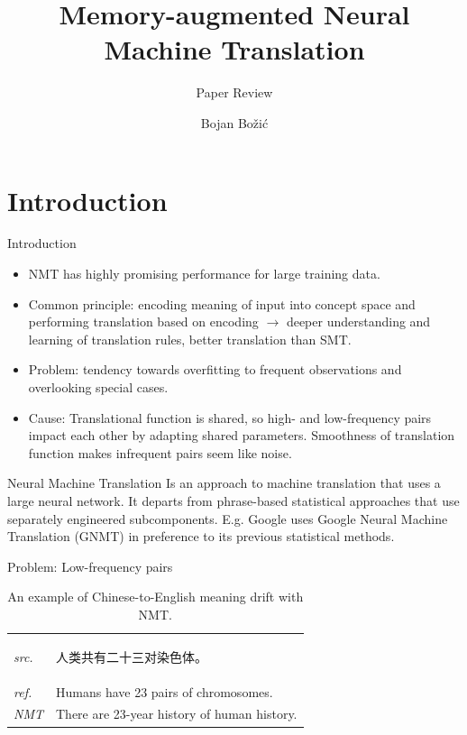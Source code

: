 \documentclass{beamer}
\title[M-NMT]{Memory-augmented Neural Machine Translation}
\subtitle{Paper Review}
\author{Bojan Bo\v{z}i\'{c}}
\begin{document}
\begin{frame}
  \titlepage
\end{frame}

\section{Introduction}
\begin{frame}{Introduction}
\begin{itemize}
  \item NMT has highly promising performance for large training data.
  \item Common principle: encoding meaning of input into concept space and performing translation based on encoding $\rightarrow$ deeper understanding and learning of translation rules, better translation than SMT. 
  \item Problem: tendency towards overfitting to frequent observations and overlooking special cases.
  \item Cause: Translational function is shared, so high- and low-frequency pairs impact each other by adapting shared parameters. Smoothness of translation function makes infrequent pairs seem like noise.
\end{itemize}
\vskip 0.1cm
\begin{block}{Neural Machine Translation}
Is an approach to machine translation that uses a large neural network. It departs from phrase-based statistical approaches that use separately engineered subcomponents. E.g. Google uses Google Neural Machine Translation (GNMT) in preference to its previous statistical methods.
\end{block}
\end{frame}

\begin{frame}{Problem: Low-frequency pairs}
\begin{table}
\begin{tabular}{ll}
\hline
\textit{src.} & \begin{CJK}{UTF8}{gbsn}人类共有二十三对染色体。\end{CJK}\\
\textit{ref.} & Humans have 23 pairs of chromosomes.\\
\textit{NMT} & There are 23-year history of human history.\\
\hline
\end{tabular}
\caption{An example of Chinese-to-English meaning drift with NMT.}
\end{table}
\end{frame}
\end{document}
